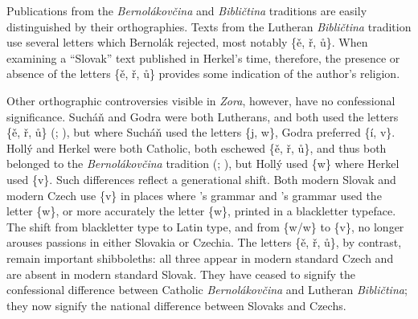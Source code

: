 Publications from the \textit{Bernolákovčina} and \textit{Bibličtina} traditions are easily distinguished by their orthographies. Texts from the Lutheran \textit{Bibličtina} tradition use several letters which Bernolák rejected, most notably \{ě, ř, ů\}. When examining a “Slovak” text published in Herkel’s time, therefore, the presence or absence of the letters \{ě, ř, ů\} provides some indication of the author’s religion.

Other orthographic controversies visible in \textit{Zora}, however, have no confessional significance. Sucháň and Godra were both Lutherans, and both used the letters \{ě, ř, ů\} (\cite[157--166]{szuhany_odplata_1835}; \cite[268--281]{godra_basne_1835}), but where Sucháň used the letters \{j, w\}, Godra preferred \{í, v\}. Hollý and Herkel were both Catholic, both eschewed \{ě, ř, ů\}, and thus both belonged to the \textit{Bernolákovčina} tradition (\cite[5--70]{holly_selanki_1835}; \cite[209--215]{herkel_prameny_1836}), but Hollý used \{w\} where Herkel used \{v\}. Such differences reflect a generational shift. Both modern Slovak and modern Czech use \{v\} in places where \citeauthor{dolezal_grammatica_1746}’s \citeyear{dolezal_grammatica_1746} grammar and \citeauthor{bernolak_grammatica_1790}’s \citeyear{bernolak_grammatica_1790} grammar used the letter \{w\}, or more accurately the letter \{{\Blackletter w}\}, printed in a blackletter typeface. The shift from blackletter type to Latin type, and from \{w/{\Blackletter w}\} to \{v\}, no longer arouses passions in either Slovakia or Czechia. The letters \{ě, ř, ů\}, by contrast, remain important shibboleths: all three appear in modern standard Czech and are absent in modern standard Slovak. They have ceased to signify the confessional difference between Catholic \textit{Bernolákovčina} and Lutheran \textit{Bibličtina}; they now signify the national difference between Slovaks and Czechs.

